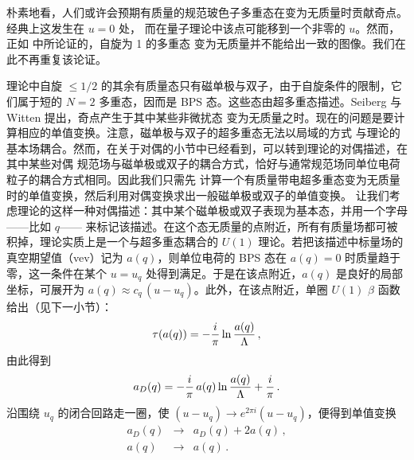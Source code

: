 朴素地看，人们或许会预期有质量的规范玻色子多重态在变为无质量时贡献奇点。经典上这发生在 $u=0$ 处，
而在量子理论中该点可能移到一个非零的 $u$。然而，正如 \cite{SW-I} 中所论证的，自旋为 1 的多重态
变为无质量并不能给出一致的图像。我们在此不再重复该论证。

理论中自旋 $\le 1/2$ 的其余有质量态只有磁单极与双子，由于自旋条件的限制，它们属于短的 $N=2$
多重态，因而是 BPS 态。这些态由超多重态描述。Seiberg 与 Witten 提出，奇点产生于其中某些非微扰态
变为无质量之时。现在的问题是要计算相应的单值变换。注意，磁单极与双子的超多重态无法以局域的方式
与理论的基本场耦合。然而，在关于对偶的小节中已经看到，可以转到理论的对偶描述，在其中某些对偶
规范场与磁单极或双子的耦合方式，恰好与通常规范场同单位电荷粒子的耦合方式相同。因此我们只需先
计算一个有质量带电超多重态变为无质量时的单值变换，然后利用对偶变换求出一般磁单极或双子的单值变换。
让我们考虑理论的这样一种对偶描述：其中某个磁单极或双子表现为基本态，并用一个字母——比如 $q$——
来标记该描述。在这个态无质量的点附近，所有有质量场都可被积掉，理论实质上是一个与超多重态耦合的
$U(1)$ 理论。若把该描述中标量场的真空期望值（vev）记为 $a(q)$，则单位电荷的 BPS 态在 $a(q)=0$ 时质量趋于零，这一条件在某个
$u=u_q$ 处得到满足。于是在该点附近，$a(q)$ 是良好的局部坐标，可展开为
$a(q)\approx c_q\,(u-u_q)$。此外，在该点附近，单圈 $U(1)$ $\beta$ 函数给出（见下一小节）：
$$
\tau (a(q))=-\frac{i}{\pi}\,{\rm ln}\,\frac{a(q)}{\Lambda}\,,
$$
由此得到
$$
a_D(q)=-\frac{i}{\pi}\,a(q)\,{\rm ln}\,\frac{a(q)}{\Lambda}+
\frac{i}{\pi} \,.
$$
沿围绕 $u_q$ 的闭合回路走一圈，使 $(u-u_q)\rightarrow e^{2\pi i} (u-u_q)$，便得到单值变换
\begin{equation}
\begin{array}{rcl}
a_D(q)& \rightarrow & a_D(q) + 2 a(q)\,,\\
a(q)  & \rightarrow & a(q)\,.
\end{array}
\label{mondq}
\end{equation}


